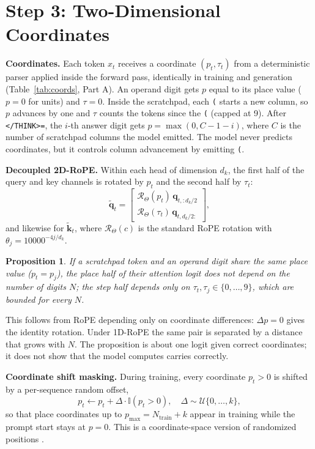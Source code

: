 \documentclass[10pt,twocolumn]{article}
\newtheorem{proposition}{Proposition}
\begin{document}
\section{Step 3: Two-Dimensional Coordinates}\label{sec:step3}

\textbf{Coordinates.} Each token $x_t$ receives a coordinate $(p_t, \tau_t)$ from a deterministic parser applied inside the forward pass, identically in training and generation (Table~\ref{tab:coords}, Part A). An operand digit gets $p$ equal to its place value ($p=0$ for units) and $\tau=0$. Inside the scratchpad, each \texttt{(} starts a new column, so $p$ advances by one and $\tau$ counts the tokens since the \texttt{(} (capped at 9). After \texttt{</THINK>=}, the $i$-th answer digit gets $p=\max(0, C-1-i)$, where $C$ is the number of scratchpad columns the model emitted. The model never predicts coordinates, but it controls column advancement by emitting \texttt{(}.

\textbf{Decoupled 2D-RoPE.} Within each head of dimension $d_k$, the first half of the query and key channels is rotated by $p_t$ and the second half by $\tau_t$:
\begin{equation}
\tilde{\mathbf{q}}_t = \begin{bmatrix} \mathcal{R}_\Theta(p_t)\,\mathbf{q}_{t,:d_k/2} \\ \mathcal{R}_\Theta(\tau_t)\,\mathbf{q}_{t,d_k/2:} \end{bmatrix},
\end{equation}
and likewise for $\tilde{\mathbf{k}}_t$, where $\mathcal{R}_\Theta(c)$ is the standard RoPE rotation with $\theta_j = 10000^{-4j/d_k}$.

\begin{proposition}
If a scratchpad token and an operand digit share the same place value ($p_t = p_j$), the place half of their attention logit does not depend on the number of digits $N$; the step half depends only on $\tau_t, \tau_j \in \{0,\dots,9\}$, which are bounded for every $N$.
\end{proposition}
This follows from RoPE depending only on coordinate differences: $\Delta p = 0$ gives the identity rotation. Under 1D-RoPE the same pair is separated by a distance that grows with $N$. The proposition is about one logit given correct coordinates; it does not show that the model computes carries correctly.

\textbf{Coordinate shift masking.} During training, every coordinate $p_t > 0$ is shifted by a per-sequence random offset,
\begin{equation}
p_t \leftarrow p_t + \Delta\cdot\mathbb{I}(p_t>0),\quad \Delta \sim \mathcal{U}\{0,\dots,k\},
\end{equation}
so that place coordinates up to $p_{\max} = N_{\text{train}} + k$ appear in training while the prompt start stays at $p=0$. This is a coordinate-space version of randomized positions \cite{ruoss2023randomized}.
\end{document}
